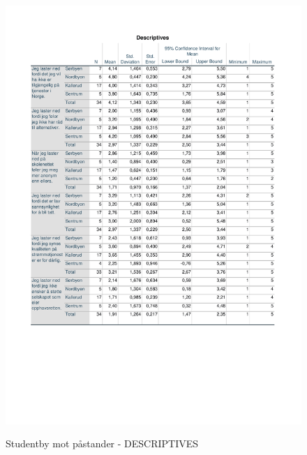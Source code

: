 \begin{figure}[H]
    \centering
    \includegraphics[scale=0.7]{case_1/bilder/DESCRIPTIVES_studentby-pastand.pdf}
    \label{fig:DESCRIPTIES_studentby mot pastander}
    \caption{Studentby mot påstander - DESCRIPTIVES}
\end{figure}

